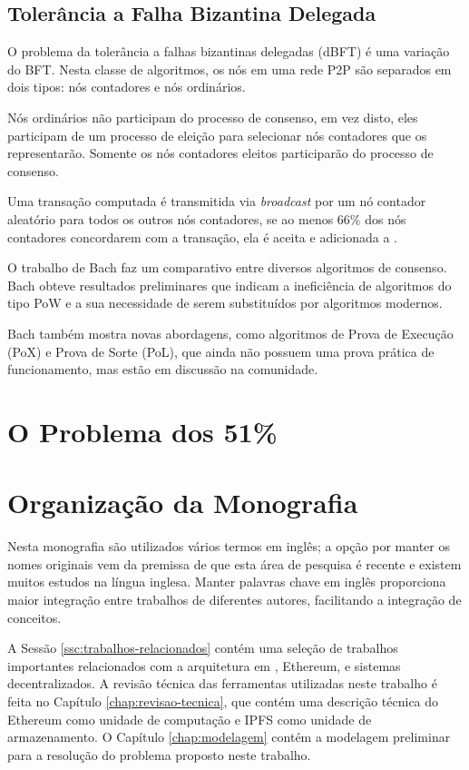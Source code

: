 \documentclass[tcc,capa]{texufpel}
\begin{document}
    \subsection{Tolerância a Falha Bizantina Delegada}\label{ssc:dbft}
    
    O problema da tolerância a falhas bizantinas delegadas (dBFT) é uma variação do BFT. Nesta classe de algoritmos, os nós em uma rede P2P são separados em dois tipos: nós contadores e nós ordinários.
    
    Nós ordinários não participam do processo de consenso, em vez disto, eles participam de um processo de eleição para selecionar nós contadores que os representarão. Somente os nós contadores eleitos participarão do processo de consenso.
    
    Uma transação computada é transmitida via \textit{broadcast} por um nó contador aleatório para todos os outros nós contadores, se ao menos 66\% dos nós contadores concordarem com a transação, ela é aceita e adicionada a \bchain.
    
    O trabalho de Bach \cite{bach2018comparative} faz um comparativo entre diversos algoritmos de consenso. Bach obteve resultados preliminares que indicam a ineficiência de algoritmos do tipo PoW e a sua necessidade de serem substituídos por algoritmos modernos. 
    
    Bach também mostra novas abordagens, como algoritmos de Prova de Execução (PoX) e Prova de Sorte (PoL), que ainda não possuem uma prova prática de funcionamento, mas estão em discussão na comunidade.
    
\section{O Problema dos 51\%}

    

\section{Organização da Monografia}\label{sc:organizao-da-monografia}
    
    Nesta monografia são utilizados vários termos em inglês; a opção por manter os nomes originais vem da premissa de que esta área de pesquisa é recente e existem muitos estudos na língua inglesa. Manter palavras chave em inglês proporciona maior integração entre trabalhos de diferentes autores, facilitando a integração de conceitos.
    
    A Sessão \ref{ssc:trabalhos-relacionados} contém uma seleção de trabalhos importantes relacionados com a arquitetura em \bchain, Ethereum,  e sistemas decentralizados. A revisão técnica das ferramentas utilizadas neste trabalho é feita no Capítulo \ref{chap:revisao-tecnica}, que contém uma descrição técnica do Ethereum como unidade de computação e IPFS como unidade de armazenamento. O Capítulo \ref{chap:modelagem} contém a modelagem preliminar para a resolução do problema proposto neste trabalho.
    
\end{document}
